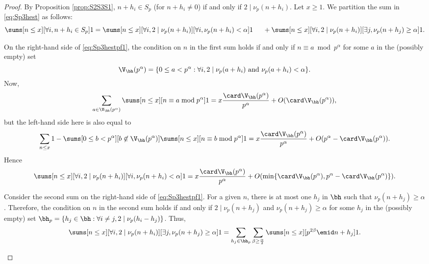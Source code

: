 \documentclass[12pt, reqno, twoside, letterpaper]{amsart}
\begin{document}
\begin{nix}
\begin{proof} 
%
By Proposition \ref{prop:S2S3S1}, $n + h_i \in S_p$ (for 
$n + h_i \ne 0$) if and only if $2 \mid \nu_p(n + h_i)$.
%
Let $x \ge 1$.
%
We partition the sum in \eqref{eq:Sp3hest} as follows:
\begin{equation}
 \label{eq:Sp3hestpf1}
 \sums[n \le x][\forall i, n + h_i \in S_p] 1
 =
  \sums[n \le x][\forall i, 2 \mid \nu_p(n + h_i)][\forall i, \nu_p(n + h_i) < \alpha] 1
   \hspace{15pt}
  + 
   \sums[n \le x][\forall i, 2 \mid \nu_p(n + h_i)][\exists j, \nu_p(n + h_j) \ge \alpha] 1.
\end{equation}
%
%
\begin{nixnix} 
%
On the right-hand side of \eqref{eq:Sp3hestpf1}, the condition on 
$n$ in the first sum holds if and only if 
$n \equiv a \bmod p^{\alpha}$ for some $a$ in the (possibly 
empty) set 
\[
 \V_{\bh}(p^{\alpha})
  =
   \{0 \le a < p^{\alpha} : \forall i, 2 \mid \nu_p(a + h_i) \,\, \hbox{and} \,\, \nu_p(a + h_i) < \alpha\}.
\]
%
Now,
\[
 \sum_{a \in \V_{\bh}(p^{\alpha})}
  \sums[n \le x][n \equiv a \bmod p^{\alpha}] 1
   =
    x\frac{\card \V_{\bh}(p^{\alpha})}{p^{\alpha}} 
    + 
     O(\card \V_{\bh}(p^{\alpha})),
\]
but the left-hand side here is also equal to 
\[
  \sum_{n \le x} 1
   -
    \sums[0 \le b < p^{\alpha}][b \not\in \V_{\bh}(p^{\alpha})] 
     \sums[n \le x][n \equiv b \bmod p^{\alpha}] 1
   =
    x\frac{\card \V_{\bh}(p^{\alpha})}{p^{\alpha}} 
    + 
     O(p^{\alpha} - \card \V_{\bh}(p^{\alpha})).
\]
%
Hence 
\begin{equation}
 \label{eq:Sp3hestpf2}
 \sums[n \le x][\forall i, 2 \mid \nu_p(n + h_i)][\forall i, \nu_p(n + h_i) < \alpha] 1
  =
   x\frac{\card \V_{\bh}(p^{\alpha})}{p^{\alpha}} 
    + 
     O(\min\{\card \V_{\bh}(p^{\alpha}),p^{\alpha} - \card \V_{\bh}(p^{\alpha})\}).
\end{equation}

Consider the second sum on the right-hand side of 
\eqref{eq:Sp3hestpf1}. 
%
For a given $n$, there is at most one $h_j$ in $\bh$ such that 
$\nu_p(n + h_j) \ge \alpha$. 
%
Therefore, the condition on $n$ in the second sum holds if and 
only if $2 \mid \nu_p(n + h_j)$ and $\nu_p(n + h_j) \ge \alpha$ 
for some $h_j$ in the (possibly empty) set 
$
 \bh_p 
  =
   \{h_j \in \bh : \forall i \ne j, 2 \mid \nu_p(h_i - h_j)\} 
$.
%
Thus,  
\[
 \sums[n \le x][\forall i, 2 \mid \nu_p(n + h_i)][\exists j, \nu_p(n + h_j) \ge \alpha] 1 
  =
   \sum_{h_j \in \bh_p}
    \sum_{\beta \ge \frac{\alpha}{2}}
     \sums[n \le x][p^{2\beta} \emid n + h_j] 1.
\]


\end{nixnix}
\end{proof}
\end{nix}
\end{document}
